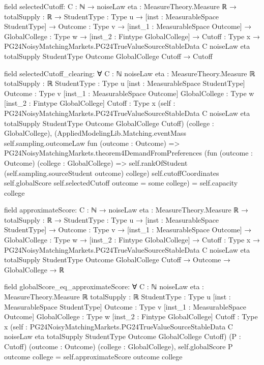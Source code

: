 \documentclass[10pt]{article}
\begin{document}
\begin{ReviewVerbatim}
field selectedCutoff:
{C : ℕ} →
  {noiseLaw eta : MeasureTheory.Measure ℝ} →
    {totalSupply : ℝ} →
      {StudentType : Type u} →
        [inst : MeasurableSpace StudentType] →
          {Outcome : Type v} →
            [inst_1 : MeasurableSpace Outcome] →
              {GlobalCollege : Type w} →
                [inst_2 : Fintype GlobalCollege] →
                  {Cutoff : Type x} →
                    PG24NoisyMatchingMarkets.PG24TrueValueSourceStableData C noiseLaw eta totalSupply StudentType
                        Outcome GlobalCollege Cutoff →
                      Cutoff

field selectedCutoff_clearing:
∀ {C : ℕ} {noiseLaw eta : MeasureTheory.Measure ℝ} {totalSupply : ℝ} {StudentType : Type u}
  [inst : MeasurableSpace StudentType] {Outcome : Type v} [inst_1 : MeasurableSpace Outcome] {GlobalCollege : Type w}
  [inst_2 : Fintype GlobalCollege] {Cutoff : Type x}
  (self :
    PG24NoisyMatchingMarkets.PG24TrueValueSourceStableData C noiseLaw eta totalSupply StudentType Outcome GlobalCollege
      Cutoff)
  (college : GlobalCollege),
  (AppliedModelingLib.Matching.eventMass self.sampling.outcomeLaw fun (outcome : Outcome) =>
      PG24NoisyMatchingMarkets.theorem4DemandFromPreferences
          (fun (outcome : Outcome) (college : GlobalCollege) =>
            self.rankOfStudent (self.sampling.sourceStudent outcome) college)
          self.cutoffCoordinates self.globalScore self.selectedCutoff outcome =
        some college) =
    self.capacity college

field approximateScore:
{C : ℕ} →
  {noiseLaw eta : MeasureTheory.Measure ℝ} →
    {totalSupply : ℝ} →
      {StudentType : Type u} →
        [inst : MeasurableSpace StudentType] →
          {Outcome : Type v} →
            [inst_1 : MeasurableSpace Outcome] →
              {GlobalCollege : Type w} →
                [inst_2 : Fintype GlobalCollege] →
                  {Cutoff : Type x} →
                    PG24NoisyMatchingMarkets.PG24TrueValueSourceStableData C noiseLaw eta totalSupply StudentType
                        Outcome GlobalCollege Cutoff →
                      Outcome → GlobalCollege → ℝ

field globalScore_eq_approximateScore:
∀ {C : ℕ} {noiseLaw eta : MeasureTheory.Measure ℝ} {totalSupply : ℝ} {StudentType : Type u}
  [inst : MeasurableSpace StudentType] {Outcome : Type v} [inst_1 : MeasurableSpace Outcome] {GlobalCollege : Type w}
  [inst_2 : Fintype GlobalCollege] {Cutoff : Type x}
  (self :
    PG24NoisyMatchingMarkets.PG24TrueValueSourceStableData C noiseLaw eta totalSupply StudentType Outcome GlobalCollege
      Cutoff)
  (P : Cutoff) (outcome : Outcome) (college : GlobalCollege),
  self.globalScore P outcome college = self.approximateScore outcome college


\end{ReviewVerbatim}
\end{document}
